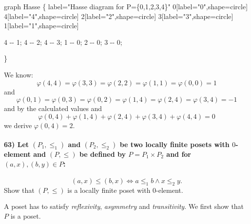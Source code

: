 \documentclass[
]{article}
\newenvironment{Shaded}{}{}
\newcommand{\NormalTok}[1]{#1}
\begin{document}
\begin{Shaded}
\begin{Highlighting}[]
\NormalTok{graph Hasse \{ }
\NormalTok{    label="Hasse diagram for P=\{0,1,2,3,4\}"}
\NormalTok{    0[label="0",shape=circle]}
\NormalTok{    4[label="4",shape=circle]}
\NormalTok{    2[label="2",shape=circle]}
\NormalTok{    3[label="3",shape=circle]}
\NormalTok{    1[label="1",shape=circle]}
    
\NormalTok{    4 {-}{-} 1;}
\NormalTok{    4 {-}{-} 2;}
\NormalTok{    4 {-}{-} 3;}
\NormalTok{    1 {-}{-} 0;    }
\NormalTok{    2 {-}{-} 0;}
\NormalTok{    3 {-}{-} 0;}
    
\NormalTok{\} }
\end{Highlighting}
\end{Shaded}

We know: \[
\varphi(4,4) = \varphi(3,3) = \varphi(2,2) = \varphi(1,1) = \varphi(0,0) = 1
\] and \[
\varphi(0,1) = \varphi(0,3) = \varphi(0,2) = \varphi(1,4) = \varphi(2,4) = \varphi(3,4) = -1
\] and by the calculated values and \[
\varphi(0,4) + \varphi(1,4) + \varphi(2,4) + \varphi(3,4) + \varphi(4,4) = 0
\] we derive \(\varphi(0,4) = 2\).

\hypertarget{let-p_1-leq_1-and-p_2-leq_2-be-two-locally-finite-posets-with-0-element-and-pleq-be-defined-by-p-p_1-times-p_2-and-for-axby-in-p}{%
\paragraph{\texorpdfstring{63) Let \((P_1, \leq_1)\) and
\((P_2, \leq_2)\) be two locally finite posets with \(0\)-element and
\((P,\leq)\) be defined by \(P = P_1 \times P_2\) and for
\((a,x),(b,y) \in P\):}{63) Let (P\_1, \textbackslash leq\_1) and (P\_2, \textbackslash leq\_2) be two locally finite posets with 0-element and (P,\textbackslash leq) be defined by P = P\_1 \textbackslash times P\_2 and for (a,x),(b,y) \textbackslash in P:}}\label{let-p_1-leq_1-and-p_2-leq_2-be-two-locally-finite-posets-with-0-element-and-pleq-be-defined-by-p-p_1-times-p_2-and-for-axby-in-p}}

\[
(a,x) \leq (b,x) \Leftrightarrow a \leq_1 b \land x \leq_2 y.
\] Show that \((P,\leq)\) is a locally finite poset with \(0\)-element.

A poset has to satisfy \emph{reflexivity}, \emph{asymmetry} and
\emph{transitivity}. We first show that \(P\) is a poset.
\end{document}
